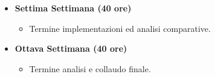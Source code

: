 {\begin{itemize}
\begin{itemize}
        \end{itemize}
        \item \textbf{Settima Settimana (40 ore)} 
        \begin{itemize}
            \item Termine implementazioni ed analisi comparative.
        \end{itemize}
        \item \textbf{Ottava Settimana (40 ore)} 
        \begin{itemize}
            \item Termine analisi e collaudo finale.
        \end{itemize}
    \end{itemize}
}

\newcommand{\totaleOre}{320}

\newcommand{\obiettiviObbligatori}{
	 \item \underline{\textit{O01}}: Acquisizione competenze sulle tematiche sopra descritte;
	 \item \underline{\textit{O02}}: Capacità di raggiungere gli obiettivi richiesti in autonomia seguendo il cronoprogramma;
	 \item \underline{\textit{O03}}: Portare a termine le implementazioni previste con una percentuale di superamento pari all'80\%. 
}

\newcommand{\obiettiviDesiderabili}{
	 \item \underline{\textit{D01}}: Portare a termine le implementazioni previste con una percentuale di superamento pari al 100\%.
}

\newcommand{\obiettiviFacoltativi}{
	 \item \underline{\textit{F01}}: Approfondire la conoscenza di Angular studiando la gestione degli stati (NGRX).
}